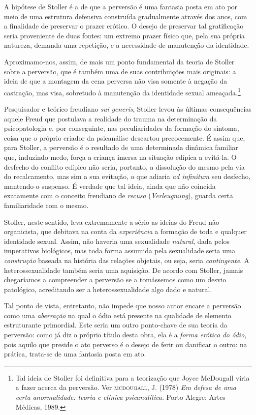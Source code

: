 A hipótese de Stoller é a de que a perversão é uma fantasia posta em ato
por meio de uma estrutura defensiva construída gradualmente através dos
anos, com a finalidade de preservar o prazer erótico. O desejo de
preservar tal gratificação seria proveniente de duas fontes: um extremo
prazer físico que, pela sua própria natureza, demanda uma repetição, e a
necessidade de manutenção da identidade.

Aproximamo-nos, assim, de mais um ponto fundamental da teoria de Stoller
sobre a perversão, que é também uma de suas contribuições mais
originais: a ideia de que a montagem da cena perversa não visa somente à
negação da castração, mas visa, sobretudo à manutenção da identidade
sexual ameaçada.\footnote{Tal ideia de Stoller foi definitiva para a
  teorização que Joyce McDougall viria a fazer acerca da perversão. Ver
  \textsc{mcdougall}, J. (1978) \emph{Em defesa de uma certa
  anormalidade: teoria e clínica psicanalítica.} Porto Alegre: Artes
  Médicas, 1989.}

Pesquisador e teórico freudiano \emph{sui generis}, Stoller levou às
últimas consequências aquele Freud que postulava a realidade do trauma
na determinação da psicopatologia e, por conseguinte, nas peculiaridades
da formação do sintoma, coisa que o próprio criador da psicanálise
descartou precocemente. É assim que, para Stoller, a perversão é o
resultado de uma determinada dinâmica familiar que, induzindo medo,
força a criança imersa na situação edípica a evitá-la. O desfecho do
conflito edípico não seria, portanto, a dissolução do mesmo pela via do
recalcamento, mas sim a sua evitação, o que adiaria \emph{ad infinitum}
seu desfecho, mantendo-o suspenso. É verdade que tal ideia, ainda que
não coincida exatamente com o conceito freudiano de \emph{recusa}
(\emph{Verleugnung}), guarda certa familiaridade com o mesmo.

Stoller, neste sentido, leva extremamente a sério as ideias do Freud
não-organicista, que debitava na conta da \emph{experiência} a formação
de toda e qualquer identidade sexual. Assim, não haveria uma sexualidade
\emph{natural}, dada pelos imperativos biológicos, mas toda forma
assumida pela sexualidade seria uma \emph{construção} baseada na
história das relações objetais, ou seja, seria \emph{contingente}. A
heterossexualidade também seria uma aquisição. De acordo com Stoller,
jamais chegaríamos a compreender a perversão se a tomássemos como um
desvio patológico, acreditando ser a heterossexualidade algo dado e
natural.

Tal ponto de vista, entretanto, não impede que nosso autor encare a
perversão como uma \emph{aberração} na qual o ódio está presente na
qualidade de elemento estruturante primordial. Este seria um outro
ponto-chave de sua teoria da perversão: como já diz o próprio título
desta obra, ela é a \emph{forma erótica do ódio}, pois aquilo que
preside o ato perverso é o desejo de ferir ou danificar o outro: na
prática, trata-se de uma fantasia posta em ato.

